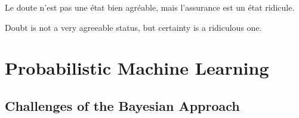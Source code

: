 
\begin{savequote}[8cm]
	\textlatin{Le doute n'est pas une état bien agréable, mais l'assurance est un état ridicule.}
	
	Doubt is not a very agreeable status, but certainty is a ridiculous one.
\end{savequote}


\chapter{Probabilistic Machine Learning}
\label{chp:bayes}







\section{Challenges of the Bayesian Approach}
\label{sec:bayes:challenges}
